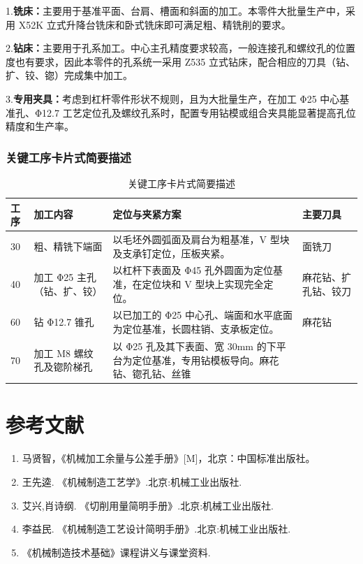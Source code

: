 \documentclass[12pt,a4paper,fontset=none]{ctexart}
\begin{document}
    1.\textbf{铣床：}主要用于基准平面、台肩、槽面和斜面的加工。本零件大批量生产中，采用 X52K 立式升降台铣床和卧式铣床即可满足粗、精铣削的要求。

    2.\textbf{钻床：}主要用于孔系加工。中心主孔精度要求较高，一般连接孔和螺纹孔的位置度也有要求，因此本零件的孔系统一采用 Z535 立式钻床，配合相应的刀具（钻、扩、铰、锪）完成集中加工。

    3.\textbf{专用夹具：}考虑到杠杆零件形状不规则，且为大批量生产，在加工 Φ25 中心基准孔、Φ12.7 工艺定位孔及螺纹孔系时，配置专用钻模或组合夹具能显著提高孔位精度和生产率。

    \subsubsection{关键工序卡片式简要描述}

    \begin{table}[H]
        \centering
        \caption{关键工序卡片式简要描述}
        \begin{tabular}{p{1.5cm} p{2.5cm} p{7.5cm} p{2.5cm}}
            \toprule
            工序 & 加工内容             & 定位与夹紧方案                                  & 主要刀具       \\
            \midrule
            30 & 粗、精铣下端面          & 以毛坯外圆弧面及肩台为粗基准，V 型块及支承钉定位，压板夹紧。          & 面铣刀        \\
            40 & 加工 Φ25 主孔（钻、扩、铰） & 以杠杆下表面及 Φ45 孔外圆面为定位基准，在定位块和 V 型块上实现完全定位。 & 麻花钻、扩孔钻、铰刀 \\
            60 & 钻 Φ12.7 锥孔       & 以已加工的 Φ25 中心孔、端面和水平底面为定位基准，长圆柱销、支承板定位。   & 麻花钻        \\
            70 & 加工 M8 螺纹孔及锪阶梯孔 & 以 Φ25 孔及其下表面、宽 30mm 的下平台为定位基准，专用钻模板导向。麻花钻、锪孔钻、丝锥 \\
            \bottomrule
        \end{tabular}\label{tab:table2}
    \end{table}


    \section{参考文献}

    \begin{enumerate}
        \item 马贤智，《机械加工余量与公差手册》[M]，北京：中国标准出版社。
        \item 王先逵. 《机械制造工艺学》.北京:机械工业出版社.
        \item 艾兴,肖诗纲. 《切削用量简明手册》.北京:机械工业出版社.
        \item 李益民. 《机械制造工艺设计简明手册》.北京:机械工业出版社.
        \item 《机械制造技术基础》课程讲义与课堂资料.
    \end{enumerate}
\end{document}

